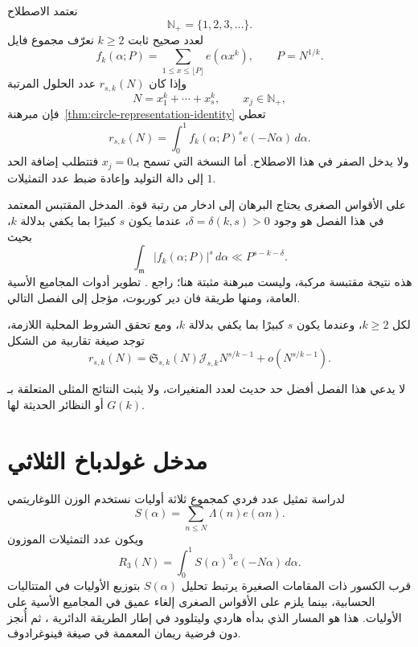 نعتمد الاصطلاح
\[
\mathbb N_{+}=\{1,2,3,\ldots\}.
\]
لعدد صحيح ثابت $k\ge2$ نعرّف مجموع فايل
\[
f_k(\alpha;P)
=
\sum_{1\le x\le \lfloor P\rfloor}e(\alpha x^k),
\qquad P=N^{1/k}.
\]
وإذا كان $r_{s,k}(N)$ عدد الحلول المرتبة
\[
N=x_1^k+\cdots+x_s^k,
\qquad x_j\in\mathbb N_{+},
\]
فإن مبرهنة~\ref{thm:circle-representation-identity} تعطي
\[
r_{s,k}(N)
=
\int_0^1 f_k(\alpha;P)^s e(-N\alpha)\,d\alpha.
\]
ولا يدخل الصفر في هذا الاصطلاح. أما النسخة التي تسمح بـ$x_j=0$ فتتطلب إضافة الحد $1$ إلى دالة التوليد وإعادة ضبط عدد التمثيلات.

على الأقواس الصغرى يحتاج البرهان إلى ادخار من رتبة قوة. المدخل المقتبس المعتمد في هذا الفصل هو وجود $\delta=\delta(k,s)>0$، عندما يكون $s$ كبيرًا بما يكفي بدلالة $k$، بحيث
\[
\int_{\mathfrak m}|f_k(\alpha;P)|^s\,d\alpha
\ll P^{s-k-\delta}.
\]
هذه نتيجة مقتبسة مركبة، وليست مبرهنة مثبتة هنا؛ راجع \cite{Vaughan1997HardyLittlewood}. تطوير أدوات المجاميع الأسية العامة، ومنها طريقة فان دير كوربوت، مؤجل إلى الفصل التالي.

\begin{theorem}
\label{thm:waring-classical-asymptotic}
لكل $k\ge2$، وعندما يكون $s$ كبيرًا بما يكفي بدلالة $k$، ومع تحقق الشروط المحلية اللازمة، توجد صيغة تقاربية من الشكل
\[
r_{s,k}(N)
=
\mathfrak S_{s,k}(N)\mathcal J_{s,k}N^{s/k-1}
+o\!\left(N^{s/k-1}\right).
\]
\end{theorem}

لا يدعي هذا الفصل أفضل حد حديث لعدد المتغيرات، ولا يثبت النتائج المثلى المتعلقة بـ$G(k)$ أو النظائر الحديثة لها.

\section{مدخل غولدباخ الثلاثي}

لدراسة تمثيل عدد فردي كمجموع ثلاثة أوليات نستخدم الوزن اللوغاريتمي
\[
S(\alpha)
=
\sum_{n\le N}\Lambda(n)e(\alpha n).
\]
ويكون عدد التمثيلات الموزون
\[
R_3(N)
=
\int_0^1S(\alpha)^3e(-N\alpha)\,d\alpha.
\]
قرب الكسور ذات المقامات الصغيرة يرتبط تحليل $S(\alpha)$ بتوزيع الأوليات في المتتاليات الحسابية، بينما يلزم على الأقواس الصغرى إلغاء عميق في المجاميع الأسية على الأوليات. هذا هو المسار الذي بدأه هاردي وليتلوود في إطار الطريقة الدائرية \cite{HardyLittlewood1923Goldbach}، ثم أُنجز دون فرضية ريمان المعممة في صيغة فينوغرادوف.

